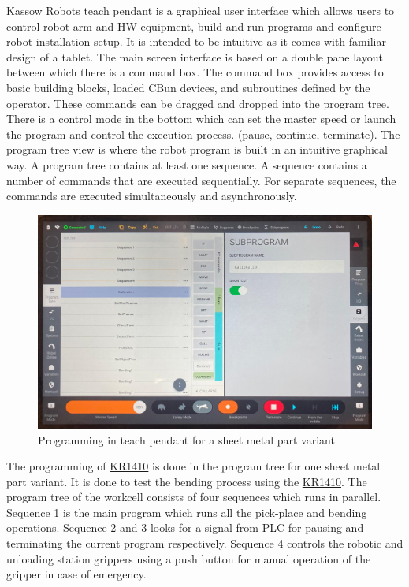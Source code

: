Kassow Robots teach pendant is a graphical user interface which allows users
to control robot arm and \hyperref[acro:HW]{HW} equipment, build and run programs and configure robot installation setup.
It is intended to be intuitive as it comes with familiar design of a tablet. The main screen interface is based
on a double pane layout between which there is a command box. The command box provides access to basic building blocks,
loaded CBun devices, and subroutines defined by the operator. These commands can be dragged and dropped into the program
tree. \cite[page 15]{kassow-software-manual}
There is a control mode in the bottom which can set the master speed or launch the program and control the execution process. (pause, continue, terminate). The program tree view is where the robot program is built in an intuitive graphical way.
A program tree contains at least one sequence. A sequence contains a number of commands that are executed sequentially.
For separate sequences, the commands are executed simultaneously and asynchronously. \cite[page 20]{kassow-software-manual}


\begin{figure}[h]
    \centering
    \includegraphics[width=\textwidth]{figures/programtree.png}
    \caption{Programming in teach pendant for a sheet metal part variant}
    \label{fig:programtree}
\end{figure}


The programming of \hyperref[acro:KR]{KR1410} is done in the program tree for one sheet metal part variant.
It is done to test the bending process using the \hyperref[acro:KR]{KR1410}.
The program tree of the workcell consists of four sequences which runs in parallel.
Sequence 1 is the main program which runs all the pick-place and bending operations.
Sequence 2 and 3 looks for a signal from \hyperref[acro:PLC]{PLC} for pausing and terminating the current program
respectively. Sequence 4 controls the robotic and unloading station grippers using a push button
for manual operation of the gripper in case of emergency.

